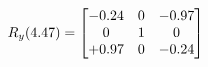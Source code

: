 \documentclass[preview]{standalone}
\begin{document}
\begin{align*}
\special{dvisvgm:raw <g id='unique000'>}R_{y}(4.47) = \begin{bmatrix}-0.24 & 0 & -0.97 \\0 & 1 & 0 \\+0.97 & 0 & -0.24\end{bmatrix}\special{dvisvgm:raw </g>}
\end{align*}
\end{document}
